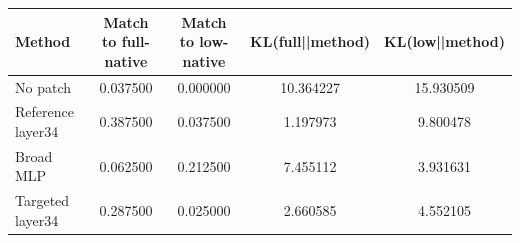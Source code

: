 \begin{tabular}{lcccc}
\toprule
Method & Match to full-native & Match to low-native & KL(full||method) & KL(low||method) \\
\midrule
No patch & 0.037500 & 0.000000 & 10.364227 & 15.930509 \\
Reference layer34 & 0.387500 & 0.037500 & 1.197973 & 9.800478 \\
Broad MLP & 0.062500 & 0.212500 & 7.455112 & 3.931631 \\
Targeted layer34 & 0.287500 & 0.025000 & 2.660585 & 4.552105 \\
\bottomrule
\end{tabular}
